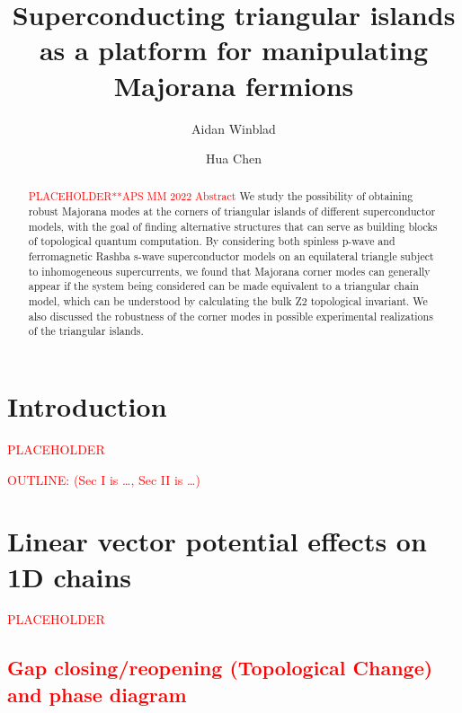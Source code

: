 \documentclass[aps,prb,showpacs,twocolumn,amsmath,amssymb,superscriptaddress]{revtex4-2}
\newcommand{\Red}[1]{\textcolor{red}{#1}}
\begin{document}
\title{Superconducting triangular islands as a platform for manipulating Majorana fermions}

\author{Aidan Winblad}

\author{Hua Chen}


\begin{abstract}
  \Red{PLACEHOLDER**APS MM 2022 Abstract}
  We study the possibility of obtaining robust Majorana modes at the corners of triangular islands of different superconductor models, with the goal of finding alternative structures that can serve as building blocks of topological quantum computation.
  By considering both spinless p-wave and ferromagnetic Rashba s-wave superconductor models on an equilateral triangle subject to inhomogeneous supercurrents, we found that Majorana corner modes can generally appear if the system being considered can be made equivalent to a triangular chain model, which can be understood by calculating the bulk Z2 topological invariant.
  We also discussed the robustness of the corner modes in possible experimental realizations of the triangular islands.
\end{abstract}

\maketitle

\section{Introduction}
\Red{PLACEHOLDER}


\Red{OUTLINE: (Sec I is \dots, Sec II is \dots)}
\section{Linear vector potential effects on 1D chains}

\Red{PLACEHOLDER}

\subsection{\Red{Gap closing/reopening (Topological Change) and phase diagram}}
\end{document}
